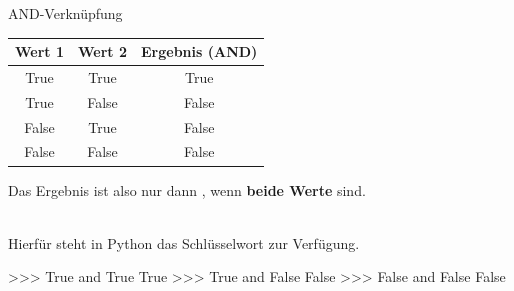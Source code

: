         \begin{frame}[fragile]{AND-Verknüpfung}
            \begin{table}[]
            \centering
                \begin{tabular}{|c|c|c|}
                    \hline
                    \rowcolor[HTML]{EFEFEF} 
                    Wert 1 & Wert 2 & Ergebnis (AND) \\ \hline
                    True   & True   & True           \\ \hline
                    True   & False  & False          \\ \hline
                    False  & True   & False          \\ \hline
                    False  & False  & False          \\ \hline
                \end{tabular}%
            \end{table}
            
            Das Ergebnis ist also nur dann , wenn \textbf{beide Werte }  sind.\\~\
            
            Hierfür steht in Python das Schlüsselwort  zur Verfügung.
            
\begin{pyconcode}
>>> True and True
True
>>> True and False
False
>>> False and False
False
\end{pyconcode}     


        \end{frame}
        
